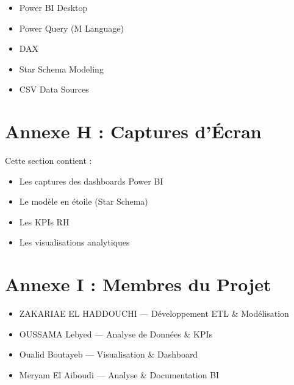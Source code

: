 \begin{itemize}
    \item Power BI Desktop
    \item Power Query (M Language)
    \item DAX
    \item Star Schema Modeling
    \item CSV Data Sources
\end{itemize}

\section*{Annexe H : Captures d’Écran}

Cette section contient :

\begin{itemize}
    \item Les captures des dashboards Power BI
    \item Le modèle en étoile (Star Schema)
    \item Les KPIs RH
    \item Les visualisations analytiques
\end{itemize}

\section*{Annexe I : Membres du Projet}

\begin{itemize}
    \item ZAKARIAE EL HADDOUCHI — Développement ETL \& Modélisation
    \item OUSSAMA Lebyed — Analyse de Données \& KPIs
    \item Oualid Boutayeb — Visualisation \& Dashboard
    \item Meryam El Aiboudi — Analyse \& Documentation BI
\end{itemize}